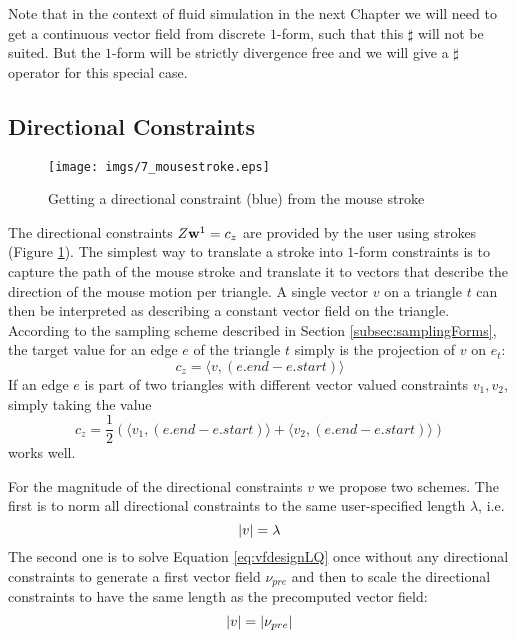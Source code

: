 Note that in the context of fluid simulation in the next Chapter we will need to get a continuous vector field from discrete $1$-form, such that this $\sharp$ will not be suited. But the $1$-form will be strictly divergence free and we will give a $\sharp$ operator for this special case.


\subsection{Directional Constraints}

\begin{figure}%
\begin{center}
\texttt{[image: imgs/7\_mousestroke.eps]}%
\end{center}
\caption{Getting a directional constraint (blue) from the mouse stroke}%
\label{fig:7_mouse}%
\end{figure}

The directional constraints $Z \textbf{w}^1 = c_z$ are provided by the user using strokes (Figure \ref{fig:7_mouse}). The simplest way to translate a stroke into $1$-form constraints is to capture the path of the mouse stroke and translate it to vectors that describe the direction of the mouse motion per triangle.
A single vector $v$ on a triangle $t$ can then be interpreted as describing a constant vector field on the triangle. According to the sampling scheme described in Section \ref{subsec:samplingForms}, the target value for an edge $e$ of the triangle $t$ simply is the projection of $v$ on $e_t$:
$$c_z = \langle v, (e.end - e.start) \rangle$$
If an edge $e$ is part of two triangles with different vector valued constraints $v_1,v_2$, simply taking the value
\[c_z= \frac{1}{2}\left(\langle v_1, (e.end - e.start) \rangle + \langle v_2, (e.end - e.start) \rangle\right)\]
works well.

For the magnitude of the directional constraints $v$ we propose two schemes. The first is to norm all directional constraints to the same user-specified length $\lambda$, i.e.
\begin{equation} \left| v \right| = \lambda \label{eq:vfconstraint1}\end{equation}
The second one is to solve Equation \ref{eq:vfdesignLQ} once without any directional constraints to generate a first vector field $\nu_{pre}$ and then to scale the directional constraints to have the same length as the precomputed vector field:
\begin{equation} \left| v \right| = \left| \nu_{pre} \right| \label{eq:vfconstraint2}\end{equation}

